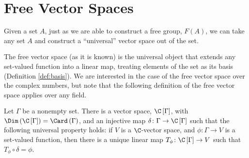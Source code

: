 \section{Free Vector Spaces}%
Given a set $A$, just as we are able to construct a free group, $F(A)$, we can take any set $A$ and construct a ``universal'' vector space out of the set.\newline

The free vector space (as it is known) is the universal object that extends any set-valued function into a linear map, treating elements of the set as its basis (Definition \ref{def:basis}). We are interested in the case of the free vector space over the complex numbers, but note that the following definition of the free vector space applies over any field. 
\begin{theorem}\label{thm:free_vector_space}
  Let $\Gamma$ be a nonempty set. There is a vector space, $\C\left[\Gamma\right]$, with $\Dim\left(\C\left[\Gamma\right]\right) = \Card\left(\Gamma\right)$, and an injective map $\delta\colon \Gamma\rightarrow \C\left[\Gamma\right]$ such that the following universal property holds: if $V$ is a $\C$-vector space, and $\phi\colon \Gamma\rightarrow V$ is a set-valued function, then there is a unique linear map $T_{\phi}\colon \C\left[\Gamma\right]\rightarrow V$ such that $T_{\phi}\circ \delta = \phi$.
  \begin{center}
  \end{center}
\end{theorem}

